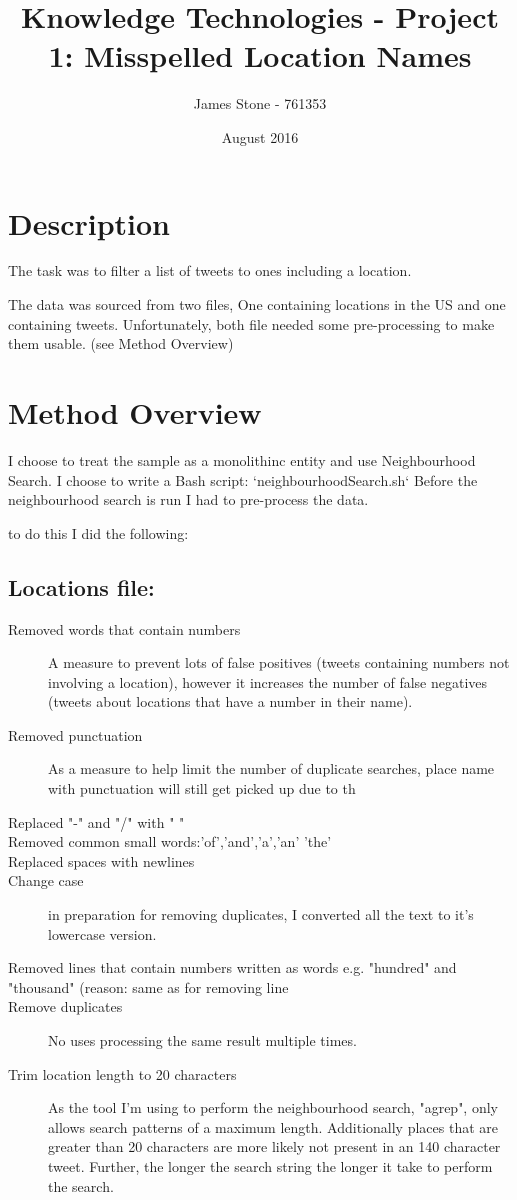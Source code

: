 \documentclass[a4paper]{article}
\title{Knowledge Technologies - Project 1: Misspelled Location Names}
\author{James Stone - 761353}
\date{August 2016}
\begin{document}
\maketitle

\section{Description}
The task was to filter a list of tweets to ones including a location.

The data was sourced from two files, One containing locations in the US and one containing tweets.
Unfortunately, both file needed some pre-processing to make them usable. (see Method Overview)
\section{Method Overview}

I choose to treat the sample as a monolithinc entity and use Neighbourhood Search.
I choose to write a Bash script:  `neighbourhoodSearch.sh`
Before the neighbourhood search is run I had to pre-process the data.

to do this I did the following:
\subsection{Locations file:}
\begin{description}
\item[Removed words that contain numbers] A measure to prevent lots of false positives (tweets containing numbers not involving a location), however it increases the number of false negatives (tweets about locations that have a number in their name).
\item[Removed punctuation] As a measure to help limit the number of duplicate searches, place name with punctuation will still get picked up due to th
\item[Replaced "-" and "/" with " "]
\item[Removed common small words:'of','and','a','an' 'the']
\item[Replaced spaces with newlines]
\item[Change case] in preparation for removing duplicates, I converted all the text to it's lowercase version.
\item[Removed lines that contain numbers written as words e.g. "hundred" and "thousand" (reason: same as for removing line]
\item[Remove duplicates] No uses processing the same result multiple times.
\item[Trim location length to 20 characters] As the tool I'm using to perform the neighbourhood search, "agrep", only allows search patterns of a maximum length. Additionally places that are greater than 20 characters are more likely not present in an 140 character tweet. Further, the longer the search string the longer it take to perform the search.
\end{description}
\end{document}
